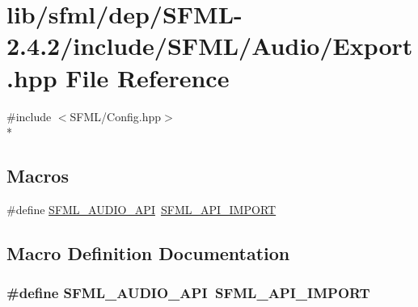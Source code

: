 \hypertarget{sfml_2dep_2_s_f_m_l-2_84_82_2include_2_s_f_m_l_2_audio_2_export_8hpp}{\section{lib/sfml/dep/\-S\-F\-M\-L-\/2.4.2/include/\-S\-F\-M\-L/\-Audio/\-Export.hpp File Reference}
\label{sfml_2dep_2_s_f_m_l-2_84_82_2include_2_s_f_m_l_2_audio_2_export_8hpp}
}
{\ttfamily \#include $<$S\-F\-M\-L/\-Config.\-hpp$>$}\\*
\subsection*{Macros}
\begin{DoxyCompactItemize}
\item 
\#define \hyperlink{sfml_2dep_2_s_f_m_l-2_84_82_2include_2_s_f_m_l_2_audio_2_export_8hpp_a4d34c0f253824ac49bdd93545913eb89}{S\-F\-M\-L\-\_\-\-A\-U\-D\-I\-O\-\_\-\-A\-P\-I}~\hyperlink{sfml_2dep_2_s_f_m_l-2_84_82_2include_2_s_f_m_l_2_config_8hpp_aba0bbe5791bee6633caa835c7f6a12a4}{S\-F\-M\-L\-\_\-\-A\-P\-I\-\_\-\-I\-M\-P\-O\-R\-T}
\end{DoxyCompactItemize}


\subsection{Macro Definition Documentation}
\hypertarget{sfml_2dep_2_s_f_m_l-2_84_82_2include_2_s_f_m_l_2_audio_2_export_8hpp_a4d34c0f253824ac49bdd93545913eb89}{
\subsubsection[{S\-F\-M\-L\-\_\-\-A\-U\-D\-I\-O\-\_\-\-A\-P\-I}]{\setlength{\rightskip}{0pt plus 5cm}\#define S\-F\-M\-L\-\_\-\-A\-U\-D\-I\-O\-\_\-\-A\-P\-I~{\bf S\-F\-M\-L\-\_\-\-A\-P\-I\-\_\-\-I\-M\-P\-O\-R\-T}}}\label{sfml_2dep_2_s_f_m_l-2_84_82_2include_2_s_f_m_l_2_audio_2_export_8hpp_a4d34c0f253824ac49bdd93545913eb89}
